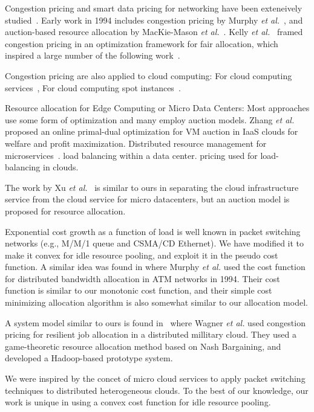Congestion pricing and smart data pricing for networking have been
exteneively studied~\cite{Sen-2013}.
Early work in 1994 includes
congestion pricing by Murphy {\em et al.}~\cite{Murphy94distributedpricing},
and auction-based resource allocation by
MacKie-Mason {\em et al.}~\cite{pricing-internet-1994}.
Kelly {\em et al.}~\cite{Kelly-1998} framed congestion pricing in an
optimization framework for fair allocation, which inspired a large
number of the following
work~\cite{gibbens1999resource,Henderson2001,Briscoe2003-M3I}.

Congestion pricing are also applied to cloud computing:
For cloud computing services~\cite{Wang-hotcloud2010,Kilcioglu-SIGMETRICS2015},
For cloud computing spot instances~\cite{Song-INFOCOM2017}.

Resource allocation for Edge Computing or Micro Data Centers:
Most approaches use some form of optimization and many employ auction
models.
Zhang {\em et al.}~\cite{Xu2017-zenith,Zhang2017-VMauction}
proposed an online primal-dual optimization for VM auction in IaaS
clouds for welfare and profit maximization.
Distributed resource management for microservices~\cite{Suresh-SOA-SOCC2017}.
load balancing within a data center\cite{Rikhtegar2021BiTEAD}.
pricing used for load-balancing in clouds\cite{Song-2014,Ren-2017}.

The work by Xu {\em et al.}~\cite{Xu2017-zenith} is similar to ours in
separating the cloud infrastructure service from the cloud service for
micro datacenters, but an auction model is proposed for resource
allocation.

Exponential cost growth as a function of load is well known in packet
switching networks (e.g., M/M/1 queue and CSMA/CD Ethernet).
We have modified it to make it convex for idle resource pooling, and
exploit it in the pseudo cost function.
A similar idea was found in \cite{Murphy94distributedpricing} where
Murphy {\em et al.} used the cost function for distributed bandwidth
allocation in ATM networks in 1994.
Their cost function is similar to our monotonic cost function, and
their simple cost minimizing allocation algorithm is also somewhat
similar to our allocation model.

A system model similar to ours is found in~\cite{Wagner-2012} where
Wagner {\em et al.} used congestion pricing for resilient job
allocation in a distributed millitary cloud.  They used a
game-theoretic resource allocation method based on Nash Bargaining,
and developed a Hadoop-based prototype system.

We were inspired by the concet of micro cloud services to apply packet
switching techniques to distributed heterogeneous clouds.
To the best of our knowledge, our work is unique in using a convex
cost function for idle resource pooling.



